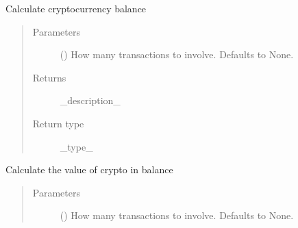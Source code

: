 \documentclass[letterpaper,10pt,english]{sphinxmanual}
\begin{document}
\begin{fulllineitems}
\begin{fulllineitems}
\begin{quote}
\begin{description}
\begin{itemize}
\end{itemize}

\end{description}\end{quote}

\end{fulllineitems}


\begin{fulllineitems}
\label{\detokenize{Recorder:crypto_env.recorder.Recorder.get_crypto_balance}}
\sphinxAtStartPar
Calculate cryptocurrency balance
\begin{quote}\begin{description}
\item[{Parameters}] \leavevmode
\sphinxAtStartPar
{} (\sphinxstyleliteralemphasis{\sphinxupquote{, }}) \textendash{} How many transactions to involve. Defaults to None.

\item[{Returns}] \leavevmode
\sphinxAtStartPar
\_description\_

\item[{Return type}] \leavevmode
\sphinxAtStartPar
\_type\_

\end{description}\end{quote}

\end{fulllineitems}


\begin{fulllineitems}
\label{\detokenize{Recorder:crypto_env.recorder.Recorder.get_crypto_value}}
\sphinxAtStartPar
Calculate the value of crypto in balance
\begin{quote}\begin{description}
\item[{Parameters}] \leavevmode
\sphinxAtStartPar
{} (\sphinxstyleliteralemphasis{\sphinxupquote{, }}) \textendash{} How many transactions to involve. Defaults to None.


\end{description}
\end{quote}
\end{fulllineitems}
\end{fulllineitems}
\end{document}
